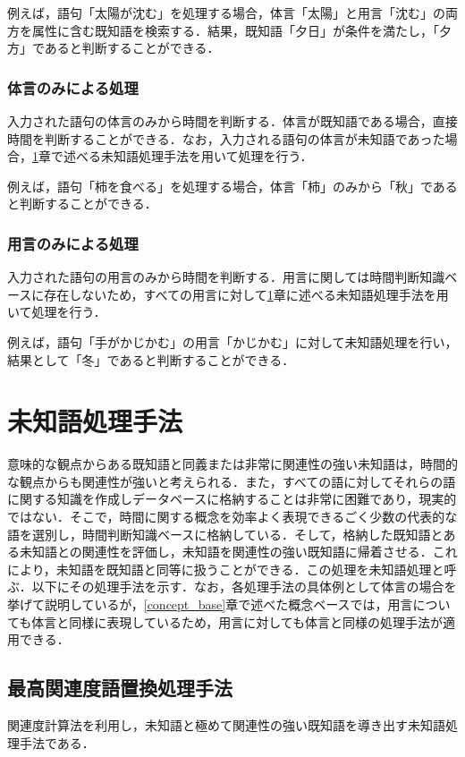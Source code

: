 例えば，語句「太陽が沈む」を処理する場合，体言「太陽」と用言「沈む」の両方を属性に含む既知語を検索する．結果，既知語「夕日」が条件を満たし，「夕方」であると判断することができる．

\subsubsection{体言のみによる処理}
入力された語句の体言のみから時間を判断する．体言が既知語である場合，直接時間を判断することができる．なお，入力される語句の体言が未知語であった場合，\ref{unknown_word_processing}章で述べる未知語処理手法を用いて処理を行う．

例えば，語句「柿を食べる」を処理する場合，体言「柿」のみから「秋」であると判断することができる．

\subsubsection{用言のみによる処理}
入力された語句の用言のみから時間を判断する．用言に関しては時間判断知識ベースに存在しないため，すべての用言に対して\ref{unknown_word_processing}章に述べる未知語処理手法を用いて処理を行う．

例えば，語句「手がかじかむ」の用言「かじかむ」に対して未知語処理を行い，結果として「冬」であると判断することができる．


\section{未知語処理手法}\label{unknown_word_processing}
意味的な観点からある既知語と同義または非常に関連性の強い未知語は，時間的な観点からも関連性が強いと考えられる．また，すべての語に対してそれらの語に関する知識を作成しデータベースに格納することは非常に困難であり，現実的ではない．そこで，時間に関する概念を効率よく表現できるごく少数の代表的な語を選別し，時間判断知識ベースに格納している．そして，格納した既知語とある未知語との関連性を評価し，未知語を関連性の強い既知語に帰着させる．これにより，未知語を既知語と同等に扱うことができる．この処理を未知語処理と呼ぶ．以下にその処理手法を示す．なお，各処理手法の具体例として体言の場合を挙げて説明しているが，\ref{concept_base}章で述べた概念ベースでは，用言についても体言と同様に表現しているため，用言に対しても体言と同様の処理手法が適用できる．

\subsection{最高関連度語置換処理手法}\label{max_processing}
関連度計算法を利用し，未知語と極めて関連性の強い既知語を導き出す未知語処理手法である．

